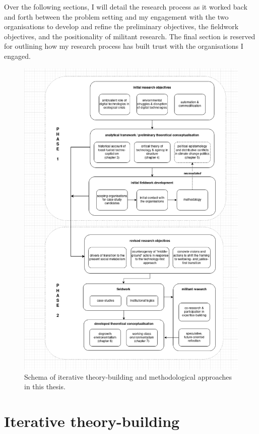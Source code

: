 \documentclass[a4paper, nobind]{templates/ociamthesis}
\begin{document}
Over the following sections, I will detail the research process as it worked back and forth between the problem setting and my engagement with the two organisations to develop and refine the preliminary objectives, the fieldwork objectives, and the positionality of militant research. The final section is reserved for outlining how my research process has built trust with the organisations I engaged.

\begin{figure}
\includegraphics[width=1\linewidth]{./figures/methodology_diagram} \caption[Methodology overview]{Schema of iterative theory-building and methodological approaches in this thesis.}\label{fig:unnamed-chunk-1}
\end{figure}

\hypertarget{iterative-theory-building}{%
\section{Iterative theory-building}\label{iterative-theory-building}}
\end{document}
